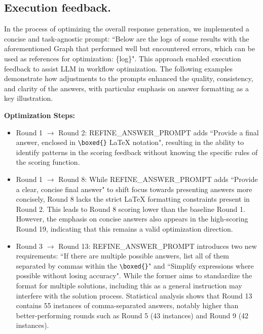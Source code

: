 \subsection{Execution feedback.}

In the process of optimizing the overall response generation, we implemented a concise and task-agnostic prompt: ``Below are the logs of some results with the aforementioned Graph that performed well but encountered errors, which can be used as references for optimization: \{log\}". This approach enabled execution feedback to assist LLM in workflow optimization. The following examples demonstrate how adjustments to the prompts enhanced the quality, consistency, and clarity of the answers, with particular emphasis on answer formatting as a key illustration.

\textbf{Optimization Steps:}
\begin{itemize}[leftmargin=20pt]
    \item {Round 1 $\rightarrow$ Round 2}: REFINE\_ANSWER\_PROMPT adds ``Provide a final answer, enclosed in \texttt{\textbackslash boxed\{\}} LaTeX notation", resulting in the ability to identify patterns in the scoring feedback without knowing the specific rules of the scoring function.

    \item {Round 1 $\rightarrow$ Round 8}: While REFINE\_ANSWER\_PROMPT adds ``Provide a clear, concise final answer" to shift focus towards presenting answers more concisely, Round 8 lacks the strict LaTeX formatting constraints present in Round 2. This leads to Round 8 scoring lower than the baseline Round 1. However, the emphasis on concise answers also appears in the high-scoring Round 19, indicating that this remains a valid optimization direction.
    
    \item {Round 3 $\rightarrow$ Round 13}: REFINE\_ANSWER\_PROMPT introduces two new requirements: ``If there are multiple possible answers, list all of them separated by commas within the \texttt{\textbackslash boxed\{\}}" and ``Simplify expressions where possible without losing accuracy". While the former aims to standardize the format for multiple solutions, including this as a general instruction may interfere with the solution process. Statistical analysis shows that Round 13 contains 55 instances of comma-separated answers, notably higher than better-performing rounds such as Round 5 (43 instances) and Round 9 (42 instances).
    
\end{itemize}
\newpage
